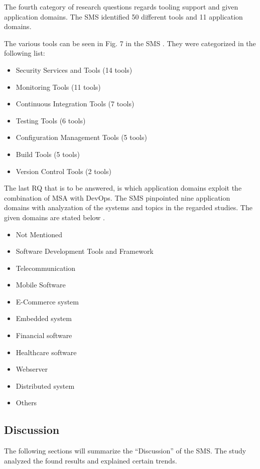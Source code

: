 The fourth category of research questions regards tooling support
and given application domains. The SMS identified 50 different tools and
11 application domains.

The various tools can be seen in Fig. 7 in the SMS \cite{waseem:SMSMSADevOps}.
They were categorized in the following list:

\begin{itemize}
    \item Security Services and Tools (14 tools)
    \item Monitoring Tools (11 tools)
    \item Continuous Integration Tools (7 tools)
    \item Testing Tools (6 tools)
    \item Configuration Management Tools (5 tools)
    \item Build Tools (5 tools)
    \item Version Control Tools (2 tools)
\end{itemize}

The last RQ that is to be answered, is which application domains
exploit the combination of MSA with DevOps. The SMS pinpointed nine
application domains with analyzation of the systems and topics
in the regarded studies. The given domains are stated below \cite{waseem:SMSMSADevOps}.

\begin{itemize}
    \item Not Mentioned
    \item Software Development Tools and Framework
    \item Telecommunication
    \item Mobile Software
    \item E-Commerce system
    \item Embedded system
    \item Financial software
    \item Healthcare software
    \item Webserver
    \item Distributed system
    \item Others
\end{itemize}


\subsection{Discussion}

The following sections will summarize the ``Discussion'' of the SMS. The study
analyzed the found results and explained certain trends.

